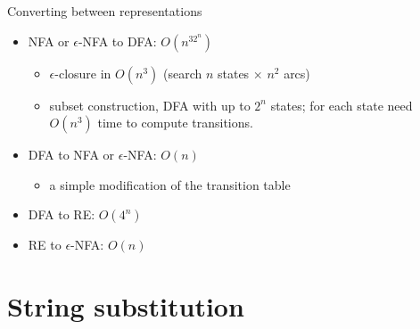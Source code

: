\documentclass[handout]{beamer}
\begin{document}
\begin{frame}{Converting between representations}

    \begin{center}
    \end{center}
        
    \begin{itemize}
        \item NFA or $\epsilon$-NFA to DFA: $O(n^32^n)$
        \begin{itemize}
            \item $\epsilon$-closure in $O(n^3)$ (search $n$ states $\times$ $n^2$ arcs)
            \item subset construction, DFA with up to $2^n$ states; for each state need $O(n^3)$ time to compute transitions.
        \end{itemize}        
        \item DFA to NFA or $\epsilon$-NFA: $O(n)$
        \begin{itemize}
            \item a simple modification of the transition table
        \end{itemize}        
        \item DFA to RE:  $O(4^n)$        
        \item RE to $\epsilon$-NFA: $O(n)$        
    \end{itemize}

\end{frame}


\section*{String substitution}
\end{document}
